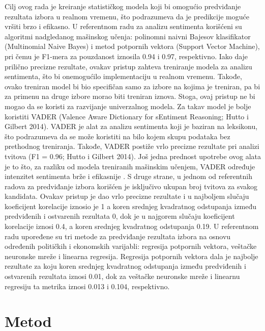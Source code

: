 \AuthorExHere

Cilj ovog rada je kreiranje statističkog modela koji bi omogućio predviđanje rezultata izbora u realnom vremenu, što podrazumeva da je predikcije moguće vršiti brzo i efikasno. U referentnom radu \parencite{ramteke2016election} za analizu sentimenta korišćeni su algoritmi nadgledanog mašinskog učenja: polinomni naivni Bajesov klasifikator (Multinomial Naive Bayes) i metod potpornih vektora (Support Vector Machine), pri čemu je F1-mera za pouzdanost \parencite{hossin2015evaluation} iznosila 0.94 i 0.97, respektivno. Iako daje prilično precizne rezultate, ovakav pristup zahteva treniranje modela za analizu sentimenta, što bi onemogućilo implementaciju u realnom vremenu. Takođe, ovako treniran model bi bio specifičan samo za izbore na kojima je treniran, pa bi za primenu na druge izbore morao biti treniran iznova. Stoga, ovaj pristup ne bi mogao da se koristi za razvijanje univerzalnog modela. Za takav model je bolje koristiti VADER (Valence Aware Dictionary for sEntiment Reasoning; Hutto i Gilbert 2014). VADER je alat za analizu sentimenta koji je baziran na leksikonu, što podrazumeva da se može koristiti na bilo kojem skupu podataka bez prethodnog treniranja. Takođe, VADER postiže vrlo precizne rezultate pri analizi tvitova (F1 = 0.96; Hutto i Gilbert 2014). Još jedna prednost upotrebe ovog alata je to što, za razliku od modela treniranih mašinskim učenjem, VADER određuje intenzitet sentimenta brže i efikasnije \parencite{hutto2014vader} . S druge strane, u jednom od referentnih radova \parencite{gaurav2013twitter} za predviđanje izbora korišćen je isključivo ukupan broj tvitova za svakog kandidata. Ovakav pristup je dao vrlo precizne rezultate i u najboljem slučaju koeficijent korelacije iznosio je 1 a koren srednjeg kvadratnog odstupanja između predviđenih i ostvarenih rezultata 0, dok je u najgorem slučaju koeficijent korelacije iznosi 0.4, a koren srednjeg kvadratnog odstupanja 0.19. U referentnom radu \parencite{zolghadr2018election} upoređene su tri metode za predviđanje rezultata izbora na osnovu određenih političkih i ekonomskih varijabli: regresija potpornih vektora, veštačke neuronske mreže i linearna regresija. Regresija potpornih vektora dala je najbolje rezultate za koju koren srednjeg kvadratnog odstupanja između predviđenih i ostvarenih rezultata iznosi 0.01, dok za veštačke neuronske mreže i linearnu regresiju ta metrika iznosi 0.013 i 0.104, respektivno. 

\section{Metod}

